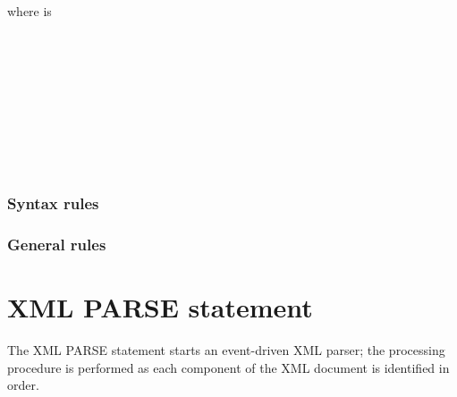 where  is

\begin{syntax}
  \begin{1=}
     \\
     \\
     \\
     \\
     \\
     \\
     \\
     \\
  \end{1=}
\end{syntax}

\subsubsection{Syntax rules}

\subsubsection{General rules}

\section{XML PARSE statement}

The XML PARSE statement starts an event-driven XML parser; the processing procedure is performed as each component of the XML document is identified in order.

